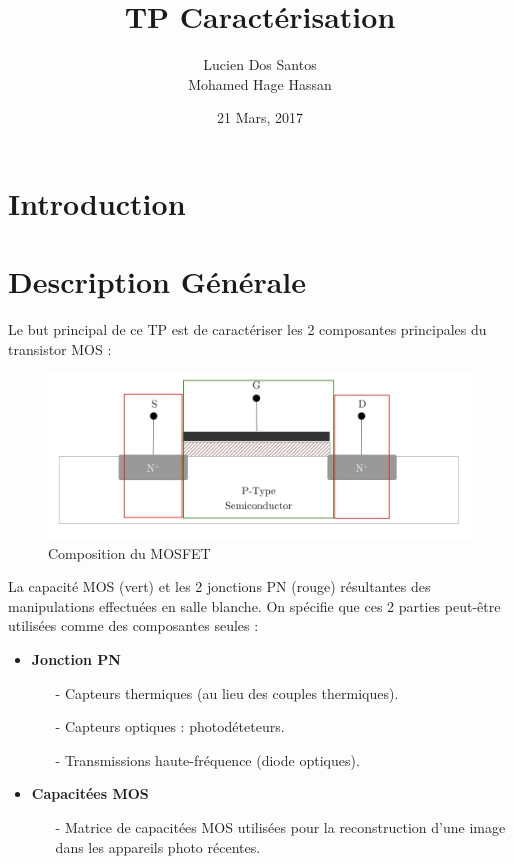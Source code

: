\documentclass[11pt]{article}
\begin{document}
\title{\textbf{TP Caract\'erisation} }
\author{Lucien Dos Santos \\ Mohamed Hage Hassan}
\date{21 Mars, 2017}
\maketitle

\tableofcontents
\clearpage

\section{Introduction}

\section{Description G\'en\'erale}

Le but principal de ce TP est de caract\'eriser les 2 composantes principales du transistor MOS :

\begin{figure}[!htb]
\centering
\includegraphics[scale=0.30]{mosfet_structure_implemented_side_view.jpg}
\caption{Composition du MOSFET}
\end{figure}

La capacit\'e MOS (vert) et les 2 jonctions PN (rouge) r\'esultantes des manipulations effectu\'ees en salle blanche.
On sp\'ecifie que ces 2 parties peut-\^etre utilis\'ees comme des composantes seules :

\begin{itemize}
\item \textbf{Jonction PN}

\begin{itemize}
\item[-] Capteurs thermiques (au lieu des couples thermiques).
\item[-] Capteurs optiques : photod\'eteteurs.
\item[-] Transmissions haute-fr\'equence (diode optiques).
\end{itemize}

\item \textbf{Capacit\'ees MOS}
\begin{itemize}
\item[-] Matrice de capacit\'ees MOS utilis\'ees pour la reconstruction d'une image dans les appareils photo r\'ecentes.
\end{itemize}

\end{itemize}
\end{document}
